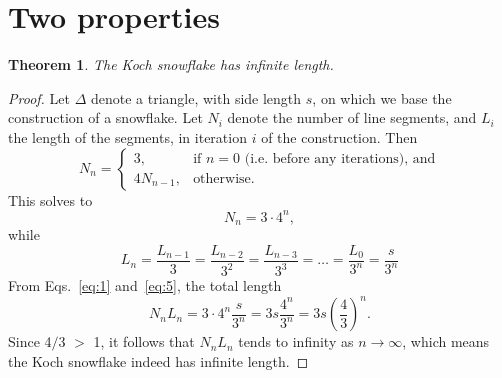 \documentclass[12pt,a4paper]{article}
\newtheorem{theorem}{Theorem}
\begin{document}
\section{Two properties}
\begin{theorem}
  The Koch snowflake has infinite length. 
\end{theorem}
\begin{proof}
  Let
  $\Delta$
  denote a triangle, with side length $s$, on which we base the construction of a snowflake.
  Let
  $N_i$ 
  denote the number of line segments, 
  and
  $L_i$ 
  the length of the segments, in iteration $i$ of the construction.
  Then
  \begin{displaymath}
    N_n =
    \begin{cases}
      3, & \text{if $n=0$ (i.e. before any iterations), and} \\4N_{n-1}, & \text{otherwise.}
    \end{cases}
  \end{displaymath}
  This solves to
  \begin{equation}
    \label{eq:1}
    N_n = 3 \cdot 4^n,
  \end{equation}
   while  
  \begin{equation}
    \label{eq:5}
    L_n = \frac{L_{n-1}}{3} = \frac{L_{n-2}}{3^2} = \frac{L_{n-3}}{3^3} = \ldots = \frac{L_0}{3^n} = \frac{s}{3^n}
  \end{equation}
  From Eqs.~\ref{eq:1}  and~\ref{eq:5}, the total length
  \begin{displaymath}
    N_nL_n = 3 \cdot 4^n\frac{s}{3^n} = 3s\frac{4^n}{3^n} = 3s\left(\frac{4}{3}\right)^n.
  \end{displaymath}
  Since 4$/$3 $>$ 1, it follows that $N_nL_n$ tends to infinity as $n \to \infty$, which means the Koch snowflake indeed has infinite length.
\end{proof}
\end{document}
